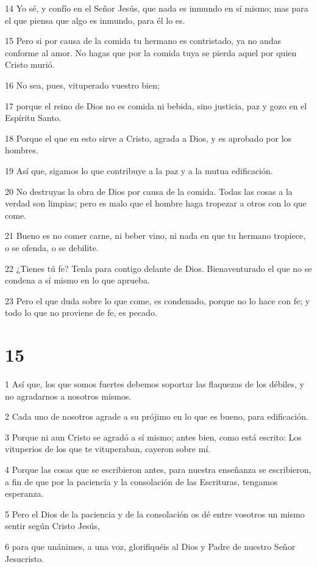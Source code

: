 \par 14 Yo sé, y confío en el Señor Jesús, que nada es inmundo en sí mismo; mas para el que piensa que algo es inmundo, para él lo es.
\par 15 Pero si por causa de la comida tu hermano es contristado, ya no andas conforme al amor. No hagas que por la comida tuya se pierda aquel por quien Cristo murió.
\par 16 No sea, pues, vituperado vuestro bien;
\par 17 porque el reino de Dios no es comida ni bebida, sino justicia, paz y gozo en el Espíritu Santo.
\par 18 Porque el que en esto sirve a Cristo, agrada a Dios, y es aprobado por los hombres.
\par 19 Así que, sigamos lo que contribuye a la paz y a la mutua edificación.
\par 20 No destruyas la obra de Dios por causa de la comida. Todas las cosas a la verdad son limpias; pero es malo que el hombre haga tropezar a otros con lo que come.
\par 21 Bueno es no comer carne, ni beber vino, ni nada en que tu hermano tropiece, o se ofenda, o se debilite.
\par 22 ¿Tienes tú fe? Tenla para contigo delante de Dios. Bienaventurado el que no se condena a sí mismo en lo que aprueba.
\par 23 Pero el que duda sobre lo que come, es condenado, porque no lo hace con fe; y todo lo que no proviene de fe, es pecado.

\chapter{15}

\par 1 Así que, los que somos fuertes debemos soportar las flaquezas de los débiles, y no agradarnos a nosotros mismos.
\par 2 Cada uno de nosotros agrade a su prójimo en lo que es bueno, para edificación.
\par 3 Porque ni aun Cristo se agradó a sí mismo; antes bien, como está escrito: Los vituperios de los que te vituperaban, cayeron sobre mí.
\par 4 Porque las cosas que se escribieron antes, para nuestra enseñanza se escribieron, a fin de que por la paciencia y la consolación de las Escrituras, tengamos esperanza.
\par 5 Pero el Dios de la paciencia y de la consolación os dé entre vosotros un mismo sentir según Cristo Jesús,
\par 6 para que unánimes, a una voz, glorifiquéis al Dios y Padre de nuestro Señor Jesucristo.


